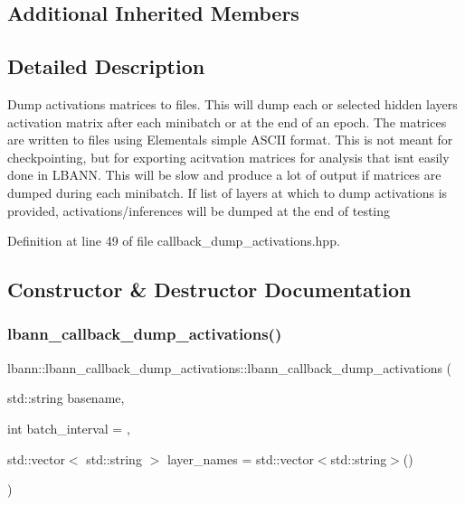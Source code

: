 \subsection*{Additional Inherited Members}


\subsection{Detailed Description}
Dump activations matrices to files. This will dump each or selected hidden layer\textquotesingle{}s activation matrix after each minibatch or at the end of an epoch. The matrices are written to files using Elemental\textquotesingle{}s simple A\+S\+C\+II format. This is not meant for checkpointing, but for exporting acitvation matrices for analysis that isn\textquotesingle{}t easily done in L\+B\+A\+NN. This will be slow and produce a lot of output if matrices are dumped during each minibatch. If list of layers at which to dump activations is provided, activations/inferences will be dumped at the end of testing 

Definition at line 49 of file callback\+\_\+dump\+\_\+activations.\+hpp.



\subsection{Constructor \& Destructor Documentation}
\mbox{\label{classlbann_1_1lbann__callback__dump__activations_a96d1412d4b29cab747bb0c1cfccd8a87}} 
\subsubsection{\texorpdfstring{lbann\+\_\+callback\+\_\+dump\+\_\+activations()}{lbann\_callback\_dump\_activations()}\hspace{0.1cm}{\footnotesize\ttfamily [1/2]}}
{\footnotesize\ttfamily lbann\+::lbann\+\_\+callback\+\_\+dump\+\_\+activations\+::lbann\+\_\+callback\+\_\+dump\+\_\+activations (\begin{DoxyParamCaption}\item[{std\+::string}]{basename,  }\item[{int}]{batch\+\_\+interval = {},  }\item[{std\+::vector$<$ std\+::string $>$}]{layer\+\_\+names = {\ttfamily std\+:\+:vector$<$std\+:\+:string$>$()} }\end{DoxyParamCaption})\hspace{0.3cm}{\ttfamily [inline]}}


